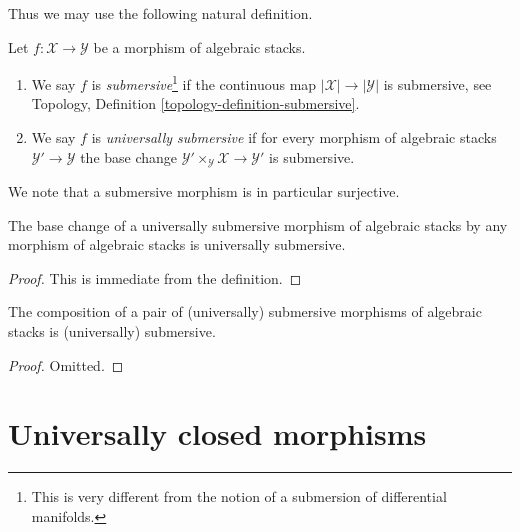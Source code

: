 \noindent
Thus we may use the following natural definition.

\begin{definition}
\label{definition-submersive}
Let $f : \mathcal{X} \to \mathcal{Y}$ be a morphism of algebraic stacks.
\begin{enumerate}
\item We say $f$ is {\it submersive}\footnote{This is very different
from the notion of a submersion of differential manifolds.}
if the continuous map $|\mathcal{X}| \to |\mathcal{Y}|$ is submersive, see
Topology, Definition \ref{topology-definition-submersive}.
\item We say $f$ is {\it universally submersive} if for every
morphism of algebraic stacks $\mathcal{Y}' \to \mathcal{Y}$
the base change $\mathcal{Y}' \times_\mathcal{Y} \mathcal{X} \to \mathcal{Y}'$
is submersive.
\end{enumerate}
\end{definition}

\noindent
We note that a submersive morphism is in particular surjective.

\begin{lemma}
\label{lemma-base-change-universally-submersive}
The base change of a universally submersive morphism of algebraic stacks
by any morphism of algebraic stacks is universally submersive.
\end{lemma}

\begin{proof}
This is immediate from the definition.
\end{proof}

\begin{lemma}
\label{lemma-composition-universally-submersive}
The composition of a pair of (universally) submersive morphisms of
algebraic stacks is (universally) submersive.
\end{lemma}

\begin{proof}
Omitted.
\end{proof}












\section{Universally closed morphisms}
\label{section-universally-closed}


